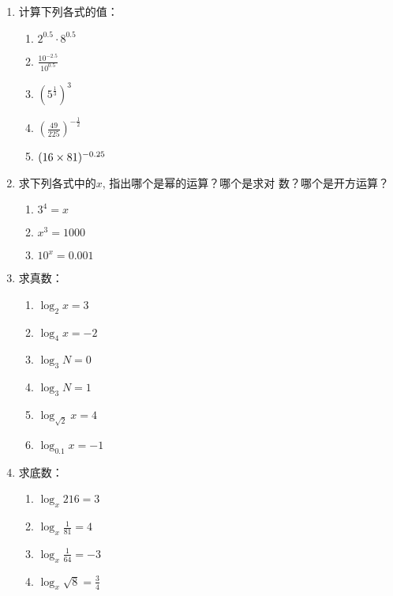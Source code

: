 \begin{ex}
\begin{enumerate}
    \item 计算下列各式的值：
\begin{multicols}{3}
\begin{enumerate}
    \item $2^{0.5}\cdot 8^{0.5}$
    \item $\frac{10^{-2.5}}{10^{0.5}}$
    \item $\left(5^{\tfrac{1}{3}}\right)^3$
    \item $\left(\frac{49}{225}\right)^{-\tfrac{1}{2}}$
    \item $(16\times 81)^{-0.25}$
\end{enumerate}
\end{multicols}   

\item 求下列各式中的$x$, 指出哪个是幂的运算？哪个是求对
数？哪个是开方运算？
\begin{multicols}{3}
    \begin{enumerate}
        \item $3^4=x$
        \item $x^3=1000$
        \item $10^x=0.001$
    \end{enumerate}
    \end{multicols}  
\item 求真数：
\begin{multicols}{3}
\begin{enumerate}
    \item $\log_2 x=3$
    \item $\log_4 x=-2$
    \item $\log_3 N=0$
    \item $\log_3 N=1$
    \item $\log_{\sqrt{2}} x=4$
    \item $\log_{0.1} x=-1$
\end{enumerate}
\end{multicols}  
\item 求底数：
\begin{multicols}{2}
\begin{enumerate}
    \item $\log_x 216 = 3 $
    \item $\log_x \frac{1}{81} = 4 $
    \item $\log_x \frac{1}{64} = -3 $
    \item $\log_x \sqrt{8} = \frac{3}{4} $
\end{enumerate}
\end{multicols}  


\end{enumerate}
\end{ex}

